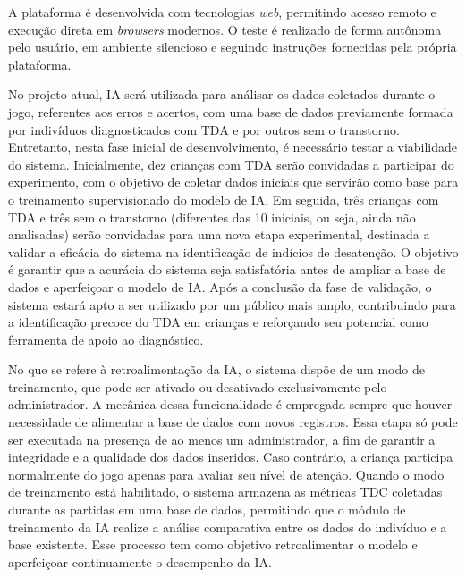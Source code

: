 A plataforma é desenvolvida com tecnologias \textit{web}, permitindo acesso remoto e execução
direta em \textit{browsers} modernos. O teste é realizado de forma autônoma pelo usuário, em ambiente silencioso e seguindo instruções fornecidas pela própria plataforma.

No projeto atual, IA será utilizada para análisar os dados coletados durante o jogo, referentes aos erros e acertos, com uma base de dados previamente formada por indivíduos diagnosticados com TDA e por outros sem o transtorno. Entretanto, nesta fase inicial de desenvolvimento, é necessário testar a viabilidade do sistema. Inicialmente, dez crianças com TDA serão convidadas a participar do experimento, com o objetivo de coletar dados iniciais que servirão como base para o treinamento supervisionado do modelo de IA. Em seguida, três crianças com TDA e três sem o transtorno (diferentes das 10 iniciais, ou seja, ainda não analisadas) 
serão convidadas para uma nova etapa experimental, destinada a validar a eficácia do sistema na identificação de indícios de desatenção. O objetivo é garantir que a acurácia do sistema seja satisfatória antes de ampliar a base de dados e aperfeiçoar o modelo de IA. Após a conclusão da fase de validação, o sistema estará apto a ser utilizado por um público mais amplo, contribuindo para a identificação precoce do TDA em crianças e reforçando seu potencial como ferramenta de apoio ao diagnóstico. 

No que se refere à retroalimentação da IA, o sistema dispõe de um modo de treinamento, que pode ser ativado ou desativado exclusivamente pelo administrador. A mecânica dessa funcionalidade é empregada sempre que houver necessidade de alimentar a base de dados com novos registros. Essa etapa só pode ser executada na presença de ao menos um administrador, a fim de garantir a integridade e a qualidade dos dados inseridos. Caso contrário, a criança participa normalmente do jogo apenas para avaliar seu nível de atenção. Quando o modo de treinamento está habilitado, o sistema armazena as métricas TDC coletadas durante as partidas em uma base de dados, permitindo que o módulo de treinamento da IA realize a análise comparativa entre os dados do indivíduo e a base existente. Esse processo tem como objetivo retroalimentar o modelo e aperfeiçoar continuamente o desempenho da IA. 

